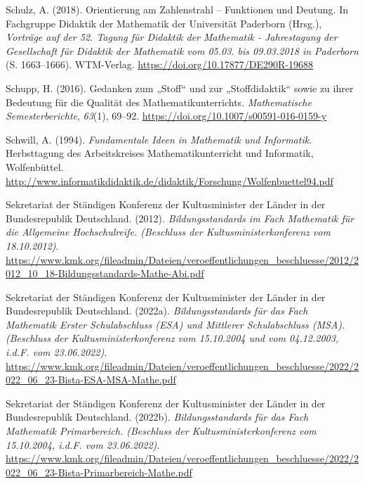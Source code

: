 \documentclass[
]{scrbook}
\newlength{\cslhangindent}
\newlength{\cslentryspacingunit} %
\newenvironment{CSLReferences}[2] %
 {%
  \setlength{\parindent}{0pt}
  \ifodd #1
  \let\oldpar\par
  \def\par{\hangindent=\cslhangindent\oldpar}
  \fi
  \setlength{\parskip}{#2\cslentryspacingunit}
 }%
 {}
\theoremstyle{definition}
\theoremstyle{definition}
\theoremstyle{definition}
\theoremstyle{definition}
\theoremstyle{remark}
\begin{document}
\begin{CSLReferences}{1}{0}
\leavevmode{}%
Schulz, A. (2018). Orientierung am {Zahlenstrahl} -- {Funktionen} und {Deutung}. In Fachgruppe Didaktik der Mathematik der Universität Paderborn (Hrsg.), \emph{Vorträge auf der 52. Tagung für Didaktik der Mathematik - Jahrestagung der Gesellschaft für Didaktik der Mathematik vom 05.03. bis 09.03.2018 in Paderborn} (S. 1663--1666). WTM-Verlag. \url{https://doi.org/10.17877/DE290R-19688}

\leavevmode{}%
Schupp, H. (2016). Gedanken zum „{Stoff}`` und zur „{Stoffdidaktik}`` sowie zu ihrer {Bedeutung} für die {Qualität} des {Mathematikunterrichts}. \emph{Mathematische Semesterberichte}, \emph{63}(1), 69--92. \url{https://doi.org/10.1007/s00591-016-0159-y}

\leavevmode{}%
Schwill, A. (1994). \emph{Fundamentale {Ideen} in {Mathematik} und {Informatik}}. Herbsttagung des Arbeitskreises Mathematikunterricht und Informatik, Wolfenbüttel. \url{http://www.informatikdidaktik.de/didaktik/Forschung/Wolfenbuettel94.pdf}

\leavevmode{}%
Sekretariat der Ständigen Konferenz der Kultusminister der Länder in der Bundesrepublik Deutschland. (2012). \emph{Bildungsstandards im {Fach} {Mathematik} für die {Allgemeine} {Hochschulreife}. (Beschluss der Kultusministerkonferenz vom 18.10.2012)}. \url{https://www.kmk.org/fileadmin/Dateien/veroeffentlichungen_beschluesse/2012/2012_10_18-Bildungsstandards-Mathe-Abi.pdf}

\leavevmode{}%
Sekretariat der Ständigen Konferenz der Kultusminister der Länder in der Bundesrepublik Deutschland. (2022a). \emph{Bildungsstandards für das {Fach} {Mathematik} {Erster} {Schulabschluss} ({ESA}) und {Mittlerer} {Schulabschluss} ({MSA}). ({Beschluss} der {Kultusministerkonferenz} vom 15.10.2004 und vom 04.12.2003, i.d.{F}. vom 23.06.2022)}. \url{https://www.kmk.org/fileadmin/Dateien/veroeffentlichungen_beschluesse/2022/2022_06_23-Bista-ESA-MSA-Mathe.pdf}

\leavevmode{}%
Sekretariat der Ständigen Konferenz der Kultusminister der Länder in der Bundesrepublik Deutschland. (2022b). \emph{Bildungsstandards für das {Fach} {Mathematik} {Primarbereich}. ({Beschluss} der {Kultusministerkonferenz} vom 15.10.2004, i.d.{F}. vom 23.06.2022)}. \url{https://www.kmk.org/fileadmin/Dateien/veroeffentlichungen_beschluesse/2022/2022_06_23-Bista-Primarbereich-Mathe.pdf}


\end{CSLReferences}
\end{document}
